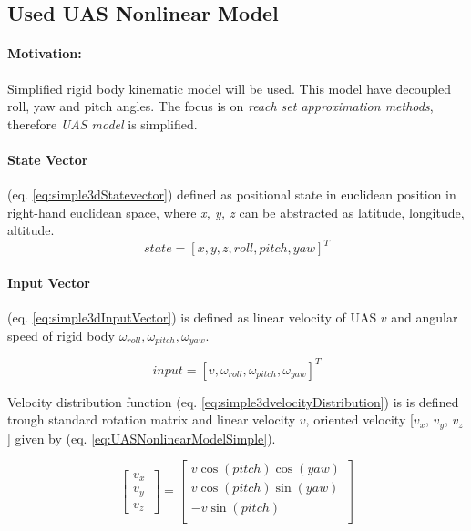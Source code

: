 \subsection{Used UAS Nonlinear Model}\label{s:UASNonlinearModel}
\paragraph{Motivation:} Simplified rigid body kinematic model will be used. This model have decoupled roll, yaw and pitch angles. The focus is on \emph{reach set approximation methods}, therefore \emph{UAS model} is simplified.

\paragraph{State Vector} (eq. \ref{eq:simple3dStatevector}) defined as positional state in euclidean position in right-hand euclidean space, where \emph{x, y, z} can be abstracted as latitude, longitude, altitude.
\begin{equation}\label{eq:simple3dStatevector}
    state = \left [ x,y,z, roll, pitch, yaw \right]^T
\end{equation}


\newpage 
\paragraph{Input Vector} (eq. \ref{eq:simple3dInputVector}) is defined as linear velocity of UAS $v$ and angular speed of rigid body $\omega_{roll}, \omega_{pitch},\omega_{yaw}$.

\begin{equation}\label{eq:simple3dInputVector}
    input = \left [ v, \omega_{roll}, \omega_{pitch},\omega_{yaw}\right ]^T
\end{equation}


\noindent Velocity distribution function (eq. \ref{eq:simple3dvelocityDistribution})  is is defined trough standard rotation matrix  and linear velocity $v$, oriented velocity [$v_x$, $v_y$, $v_z$] given by (eq. \ref{eq:UASNonlinearModelSimple}).

\begin{equation}\label{eq:simple3dvelocityDistribution}
    \begin{bmatrix}
    v_x\\
    v_y\\
    v_z\
    \end{bmatrix}
    =
    \begin{bmatrix}
         v\cos(pitch)\cos(yaw)\\
         v\cos(pitch)\sin(yaw)\\
         -v\sin(pitch)\\
    \end{bmatrix}
\end{equation}

